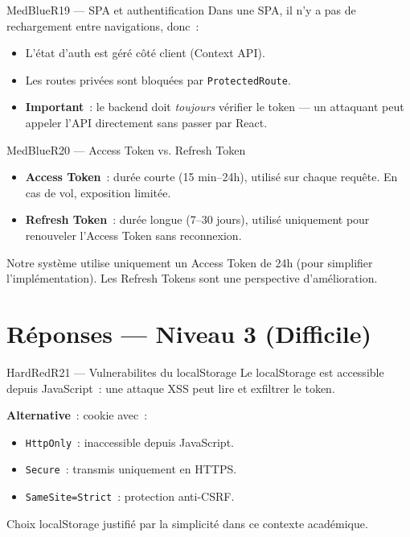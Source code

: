 \documentclass[12pt,a4paper,oneside]{report}
\begin{document}
\begin{qbox}{MedBlue}{R19 --- SPA et authentification}
Dans une SPA, il n'y a pas de rechargement entre navigations, donc~:
\begin{itemize}
  \item L'état d'auth est géré côté client (Context API).
  \item Les routes privées sont bloquées par \texttt{ProtectedRoute}.
  \item \textbf{Important}~: le backend doit \textit{toujours} vérifier
        le token --- un attaquant peut appeler l'API directement sans
        passer par React.
\end{itemize}
\end{qbox}

\begin{qbox}{MedBlue}{R20 --- Access Token vs. Refresh Token}
\begin{itemize}
  \item \textbf{Access Token}~: durée courte (15 min--24h), utilisé sur
        chaque requête. En cas de vol, exposition limitée.
  \item \textbf{Refresh Token}~: durée longue (7--30 jours), utilisé
        uniquement pour renouveler l'Access Token sans reconnexion.
\end{itemize}
Notre système utilise uniquement un Access Token de 24h (pour simplifier
l'implémentation). Les Refresh Tokens sont une perspective
d'amélioration.
\end{qbox}

\vspace{0.5cm}

\section*{\textcolor{HardRed}{Réponses --- Niveau 3 (Difficile)}}

\begin{qbox}{HardRed}{R21 --- Vulnerabilites du localStorage}
Le localStorage est accessible depuis JavaScript~: une attaque XSS peut
lire et exfiltrer le token.

\textbf{Alternative}~: cookie avec~:
\begin{itemize}
  \item \texttt{HttpOnly}~: inaccessible depuis JavaScript.
  \item \texttt{Secure}~: transmis uniquement en HTTPS.
  \item \texttt{SameSite=Strict}~: protection anti-CSRF.
\end{itemize}
Choix localStorage justifié par la simplicité dans ce contexte
académique.
\end{qbox}
\end{document}
